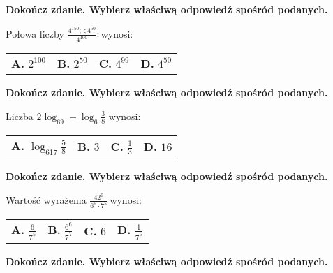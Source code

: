 \documentclass[12pt,a4paper]{article}
\theoremstyle{break}
\begin{document}
	
	\begin{zad}[0-1]
		\textbf{Dokończ zdanie. Wybierz właściwą odpowiedź spośród podanych.}
	\end{zad} 
	
	Połowa liczby \Large$\frac{4^{150};\cdot;4^{50}}{4^{100}}:$\normalsize wynosi:
	
	\vspace{0.5cm}
	\begin{tabular}{p{3.5cm} p{3.5cm} p{3.5cm} p{3.5cm}}
		\textbf{A. }$2^{100}$&
		\textbf{B. }$2^{50}$&
		\textbf{C. }$4^{99}$&
		\textbf{D. }$4^{50}$\\
	\end{tabular}
	
	
	\begin{zad}[0-1]
		\textbf{Dokończ zdanie. Wybierz właściwą odpowiedź spośród podanych.}
	\end{zad} 
	
	Liczba $2\log_69-\log_6\frac{3}{8}$ wynosi:
	
	\vspace{0.5cm}
	\begin{tabular}{p{3.5cm} p{3.5cm} p{3.5cm} p{3.5cm}}
		\textbf{A. }$\log_617\frac{5}{8}$&
		\textbf{B. }$3$&
		\textbf{C. }$\frac{1}{3}$&
		\textbf{D. }$16$\\
	\end{tabular}
	
	
	\begin{zad}[0-1]
		\textbf{Dokończ zdanie. Wybierz właściwą odpowiedź spośród podanych.}
	\end{zad} 
	
	Wartość wyrażenia \large$\frac{42^6}{6^6\cdot7^5}\:$\normalsize wynosi:
	
	\vspace{0.5cm}
	\begin{tabular}{p{3.5cm} p{3.5cm} p{3.5cm} p{3.5cm}}
		\textbf{A. }$\frac{6}{7^5}$&
		\textbf{B. }$\frac{6^6}{7^7}$&
		\textbf{C. }$6$&
		\textbf{D. }$\frac{1}{7^5}$\\
	\end{tabular}
	
	
	\begin{zad}[0-1]
		\textbf{Dokończ zdanie. Wybierz właściwą odpowiedź spośród podanych.}
	\end{zad} 
	
\end{document}
